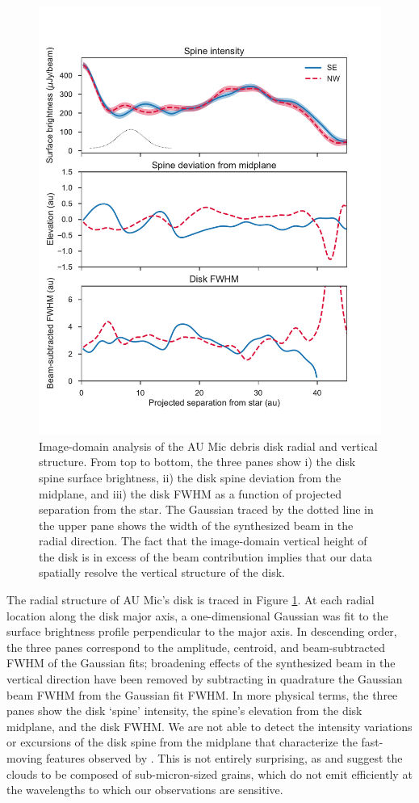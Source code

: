 \documentclass[12pt,oneside]{article}
\begin{document}
\begin{figure}
  \centering
  \includegraphics[width=.75\linewidth]{figures/boccaletti_plots}
  \caption{
  Image-domain analysis of the AU Mic debris disk radial and vertical structure. 
  From top to bottom, the three panes show i) the disk spine surface brightness, ii) the disk spine deviation from the midplane, and iii) the disk FWHM as a function of projected separation from the star. 
  The Gaussian traced by the dotted line in the upper pane shows the width of the  synthesized beam in the radial direction.
  The fact that the image-domain vertical height of the disk is in excess of the beam contribution implies that our data spatially resolve the vertical structure of the disk.} 
  \label{fig: boccaletti}
\end{figure}

The radial structure of AU Mic's disk is traced in Figure \ref{fig: boccaletti}. 
At each radial location along the disk major axis, a one-dimensional Gaussian was fit to the surface brightness profile perpendicular to the major axis.
In descending order, the three panes correspond to the amplitude, centroid, and beam-subtracted FWHM of the Gaussian fits; broadening effects of the synthesized beam in the vertical direction have been removed by subtracting in quadrature the Gaussian beam FWHM from the Gaussian fit FWHM.
In more physical terms, the three panes show the disk `spine' intensity, the spine's elevation from the disk midplane, and the disk FWHM.
We are not able to detect the intensity variations or excursions of the disk spine from the midplane that characterize the fast-moving features observed by \cite{boccaletti15}.
This is not entirely surprising, as \cite{sezestre17} and \cite{chiang&fung17} suggest the clouds to be composed of sub-micron-sized grains, which do not emit efficiently at the wavelengths to which our observations are sensitive.
\end{document}

